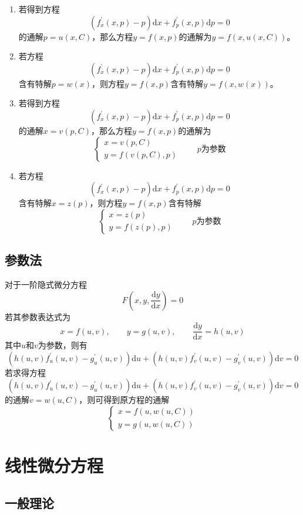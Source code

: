 \documentclass[lang = cn, scheme = chinese, thmcnt = section]{elegantbook}
\begin{document}
\begin{enumerate}
	\item 若得到方程
	$$
	(f_x^{\prime}(x,p)-p)\mathrm{d}x+f_p^{\prime}(x,p)\mathrm{d}p=0
	$$
	的通解$p=u(x,C)$，那么方程$y=f(x,p)$的通解为$y=f(x,u(x,C))$。
	\item 若方程
	$$
	(f_x^{\prime}(x,p)-p)\mathrm{d}x+f_p^{\prime}(x,p)\mathrm{d}p=0
	$$
	含有特解$p=w(x)$，则方程$y=f(x,p)$含有特解$y=f(x,w(x))$。
	\item 若得到方程
	$$
	(f_x^{\prime}(x,p)-p)\mathrm{d}x+f_p^{\prime}(x,p)\mathrm{d}p=0
	$$
	的通解$x=v(p,C)$，那么方程$y=f(x,p)$的通解为%
	$$
	\begin{cases}
		x=v(p,C)\\
		y=f(v(p,C),p)
	\end{cases}
	\qquad p\text{为参数}
	$$
	\item 若方程
	$$
	(f_x^{\prime}(x,p)-p)\mathrm{d}x+f_p^{\prime}(x,p)\mathrm{d}p=0
	$$
	含有特解$x=z(p)$，则方程$y=f(x,p)$含有特解%
	$$
	\begin{cases}
		x=z(p)\\
		y=f(z(p),p)
	\end{cases}
	\qquad p\text{为参数}
	$$
\end{enumerate}

\subsection{参数法}

对于一阶隐式微分方程
$$
F\left(x,y,\frac{\mathrm{d}y}{\mathrm{d}x}\right)=0
$$
若其参数表达式为
$$
x=f(u,v),\qquad y=g(u,v),\qquad \frac{\mathrm{d}y}{\mathrm{d}x}=h(u,v)
$$
其中$u$和$v$为参数，则有
$$
(h(u,v)f_u^{\prime}(u,v)-g_u^{\prime}(u,v))\mathrm{d}u+(h(u,v)f_v^{\prime}(u,v)-g_v^{\prime}(u,v))\mathrm{d}v=0
$$
若求得方程
$$
(h(u,v)f_u^{\prime}(u,v)-g_u^{\prime}(u,v))\mathrm{d}u+(h(u,v)f_v^{\prime}(u,v)-g_v^{\prime}(u,v))\mathrm{d}v=0
$$
的通解$v=w(u,C)$，则可得到原方程的通解
$$
\begin{cases}x=f(u,w(u,C))\\y=g(u,w(u,C))\end{cases}
$$

\section{线性微分方程}

\subsection{一般理论}
\end{document}
